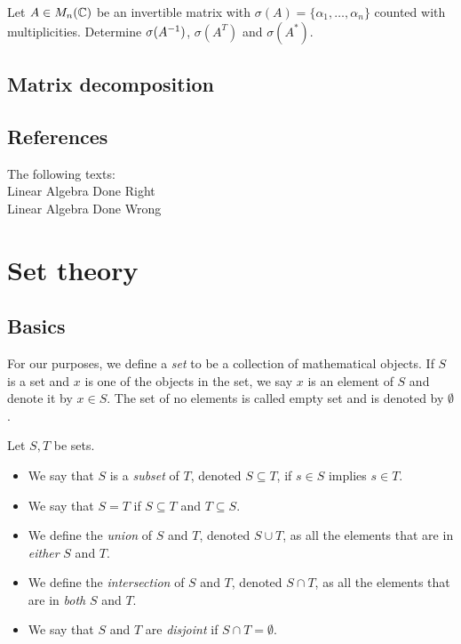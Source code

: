 \documentclass{article}
\begin{document}
\begin{exercise}
Let $A\in M_n({\mathbb{C}})$ be an invertible matrix with $\sigma(A) = \{\alpha_1,\ldots, \alpha_n\}$ counted with multiplicities. Determine $\sigma(A^{-1})$, $\sigma(A^T)$ and $\sigma(A^*)$.
\end{exercise}


\subsection{Matrix decomposition}


\subsection{References}
The following texts: \\
Linear Algebra Done Right \cite{linalgright} \\
Linear Algebra Done Wrong \cite{linalgwrong}

\section{Set theory}

\subsection{Basics}

For our purposes, we define a \emph{set} to be a collection of mathematical objects. If $S$ is a set and $x$ is one of the objects in the set, we say $x$ is an element of $S$ and denote it by $x\in S$. The set of no elements is called empty set and is denoted by $\emptyset$.

\begin{definition}
Let $S, T$ be sets. 
\begin{itemize}
    \item We say that $S$ is a \emph{subset} of $T$, denoted $S\subseteq T$, if $s\in S$ implies $s\in T$. 
    \item We say that $S=T$ if $S\subseteq T$ and $T\subseteq S$.
    \item We define the \emph{union} of $S$ and $T$, denoted $S \cup T$, as all the elements that are in \emph{either} $S$ and $T$.
    \item We define the \emph{intersection} of $S$ and $T$, denoted $S \cap T$, as all the elements that are in \emph{both} $S$ and $T$.
    \item We say that $S$ and $T$ are \emph{disjoint} if $S \cap T = \emptyset$.
\end{itemize}
\end{definition}
\end{document}
